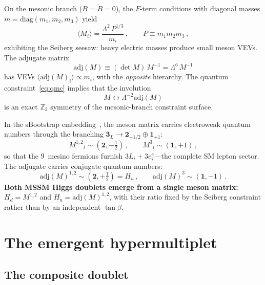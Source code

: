 \documentclass[aps,prd,twocolumn,showpacs,preprintnumbers,superscriptaddress,floatfix]{revtex4-2}
\newcommand{\adj}{\mathrm{adj}}
\newcommand{\diag}{\mathrm{diag}}
\begin{document}
On the mesonic branch ($B = \tilde{B} = 0$), the $F$-term conditions
with diagonal masses $m = \diag(m_1, m_2, m_3)$ yield
\begin{equation}
  \langle M_i\rangle = \frac{\Lambda^2\,P^{1/3}}{m_i}\,,
  \qquad
  P \equiv m_1 m_2 m_3\,,
  \label{eq:Mvev}
\end{equation}
exhibiting the Seiberg seesaw: heavy electric masses produce small
meson VEVs.
The adjugate matrix
\begin{equation}
  \adj(M) \equiv (\det M)\,M^{-1} = \Lambda^6\,M^{-1}
  \label{eq:adj}
\end{equation}
has VEVs $\langle\adj(M)_i\rangle \propto m_i$, with the
\emph{opposite} hierarchy.
The quantum constraint~\eqref{eq:qmc} implies that the involution
\begin{equation}
  M \longleftrightarrow \Lambda^{-2}\adj(M)
  \label{eq:involution}
\end{equation}
is an exact $\mathbb{Z}_2$ symmetry of the mesonic-branch constraint
surface.

In the sBootstrap embedding~\cite{Rivero:2024epjc}, the meson
matrix carries electroweak quantum numbers through the branching
$\mathbf{3}_L \to \mathbf{2}_{-1/2} \oplus \mathbf{1}_{+1}$:
\begin{equation}
  M^{1,2}{}_i \sim (\mathbf{2}, -\tfrac{1}{2})\,,
  \qquad
  M^{3}{}_i \sim (\mathbf{1}, +1)\,,
\end{equation}
so that the 9~mesino fermions furnish $3L_i + 3e^c_i$---the
complete SM lepton sector.
The adjugate carries conjugate quantum numbers:
\begin{equation}
  \adj(M)^{1,2} \sim (\mathbf{2}, +\tfrac{1}{2}) = H_u\,,
  \qquad
  \adj(M)^{3} \sim (\mathbf{1}, -1)\,.
  \label{eq:adj_EW}
\end{equation}
\textbf{Both MSSM Higgs doublets emerge from a single meson
matrix:} $H_d = M^{1,2}$ and $H_u = \adj(M)^{1,2}$, with their
ratio fixed by the Seiberg constraint rather than by an independent
$\tan\beta$.


\section{The emergent hypermultiplet}
\label{sec:N2}

\subsection{The composite doublet}
\end{document}
